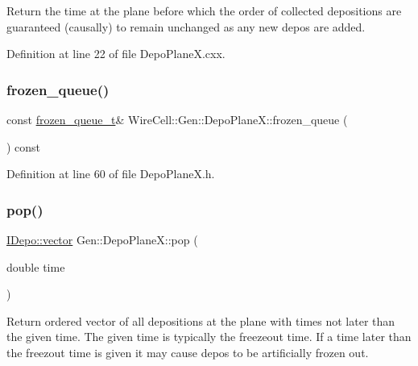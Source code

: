 Return the time at the plane before which the order of collected depositions are guaranteed (causally) to remain unchanged as any new depos are added. 

Definition at line 22 of file Depo\+Plane\+X.\+cxx.

\mbox{\label{class_wire_cell_1_1_gen_1_1_depo_plane_x_a05b5b5aae520941719605f4eba4caa5e}} 
\subsubsection{\texorpdfstring{frozen\+\_\+queue()}{frozen\_queue()}}
{\footnotesize\ttfamily const \hyperlink{class_wire_cell_1_1_gen_1_1_depo_plane_x_a4f4387d05fb9d3a02c96da6abac2861e}{frozen\+\_\+queue\+\_\+t}\& Wire\+Cell\+::\+Gen\+::\+Depo\+Plane\+X\+::frozen\+\_\+queue (\begin{DoxyParamCaption}{ }\end{DoxyParamCaption}) const\hspace{0.3cm}{\ttfamily [inline]}}



Definition at line 60 of file Depo\+Plane\+X.\+h.

\mbox{\label{class_wire_cell_1_1_gen_1_1_depo_plane_x_a1558bc9b6186a753d8b8f73fbd833475}} 
\subsubsection{\texorpdfstring{pop()}{pop()}}
{\footnotesize\ttfamily \hyperlink{class_wire_cell_1_1_i_data_ae1a9f863380499bb43f39fabb6276660}{I\+Depo\+::vector} Gen\+::\+Depo\+Plane\+X\+::pop (\begin{DoxyParamCaption}\item[{double}]{time }\end{DoxyParamCaption})}

Return ordered vector of all depositions at the plane with times not later than the given time. The given time is typically the freezeout time. If a time later than the freezout time is given it may cause depos to be artificially frozen out. 

